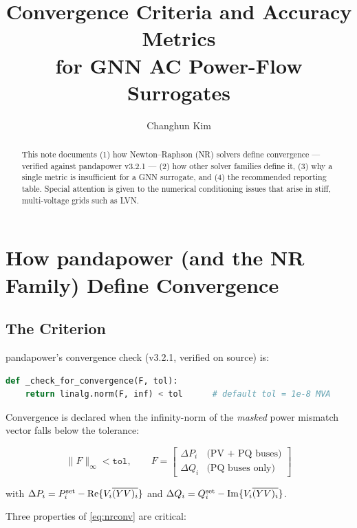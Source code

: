 \documentclass{article}
\title{Convergence Criteria and Accuracy Metrics\\
  for GNN AC Power-Flow Surrogates}
\author{Changhun Kim}
\begin{document}
\maketitle

\begin{abstract}
  This note documents (1) how Newton--Raphson (NR) solvers define
  convergence --- verified against pandapower v3.2.1 --- (2) how other
  solver families define it, (3) why a single metric is insufficient for
  a GNN surrogate, and (4) the recommended reporting table.  Special
  attention is given to the numerical conditioning issues that arise in
  stiff, multi-voltage grids such as LVN.
\end{abstract}

\section{How pandapower (and the NR Family) Define Convergence}

\subsection{The Criterion}

pandapower's convergence check (v3.2.1, verified on source) is:

\begin{lstlisting}[language=Python]
def _check_for_convergence(F, tol):
    return linalg.norm(F, inf) < tol      # default tol = 1e-8 MVA
\end{lstlisting}

Convergence is declared when the infinity-norm of the \emph{masked} power
mismatch vector falls below the tolerance:

\begin{equation}
  \|F\|_\infty < \texttt{tol},
  \qquad
  F =
  \begin{bmatrix}
    \Delta P_i & \text{(PV + PQ buses)} \\
    \Delta Q_i & \text{(PQ buses only)}
  \end{bmatrix}
  \label{eq:nrconv}
\end{equation}

with $\Delta P_i = P_i^{\rm set} - \mathrm{Re}\{V_i \overline{(YV)_i}\}$
and $\Delta Q_i = Q_i^{\rm set} - \mathrm{Im}\{V_i \overline{(YV)_i}\}$.

Three properties of \eqref{eq:nrconv} are critical:
\end{document}

